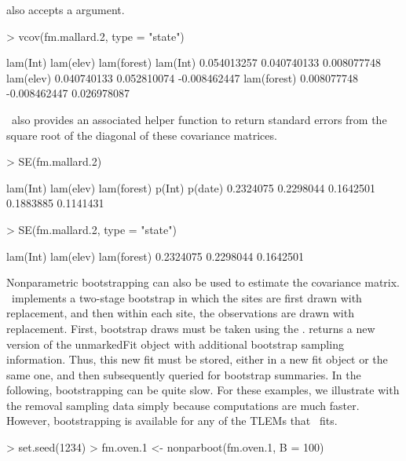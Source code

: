 \documentclass[article,shortnames]{jss}
\newcommand{\um}{\pkg{unmarked}}
\begin{document}
 also accepts a  argument.

\begin{Schunk}
\begin{Sinput}
> vcov(fm.mallard.2, type = "state")
\end{Sinput}
\begin{Soutput}
               lam(Int)    lam(elev)  lam(forest)
lam(Int)    0.054013257  0.040740133  0.008077748
lam(elev)   0.040740133  0.052810074 -0.008462447
lam(forest) 0.008077748 -0.008462447  0.026978087
\end{Soutput}
\end{Schunk}

\um\ also provides an associated helper function  to return
standard errors from the square root of the diagonal of these
covariance matrices.

\begin{Schunk}
\begin{Sinput}
> SE(fm.mallard.2)
\end{Sinput}
\begin{Soutput}
   lam(Int)   lam(elev) lam(forest)      p(Int)     p(date) 
  0.2324075   0.2298044   0.1642501   0.1883885   0.1141431 
\end{Soutput}
\begin{Sinput}
> SE(fm.mallard.2, type = "state")
\end{Sinput}
\begin{Soutput}
   lam(Int)   lam(elev) lam(forest) 
  0.2324075   0.2298044   0.1642501 
\end{Soutput}
\end{Schunk}

Nonparametric bootstrapping can also be used to estimate the
covariance matrix. \um\ implements a two-stage bootstrap in which the
sites are first drawn with replacement, and then within each site, the
observations are drawn with replacement.  First, bootstrap draws must
be taken using the .   returns a new
version of the unmarkedFit object with additional bootstrap sampling
information.  Thus, this new fit must be stored, either in a new fit
object or the same one, and then subsequently queried for bootstrap
summaries.  In the following, bootstrapping can be quite slow.  For
these examples, we illustrate with the removal sampling data simply
because computations are much faster.  However, bootstrapping is
available for any of the TLEMs that \um\ fits.

\begin{Schunk}
\begin{Sinput}
> set.seed(1234)
> fm.oven.1 <- nonparboot(fm.oven.1, B = 100)
\end{Sinput}
\end{Schunk}
\end{document}
